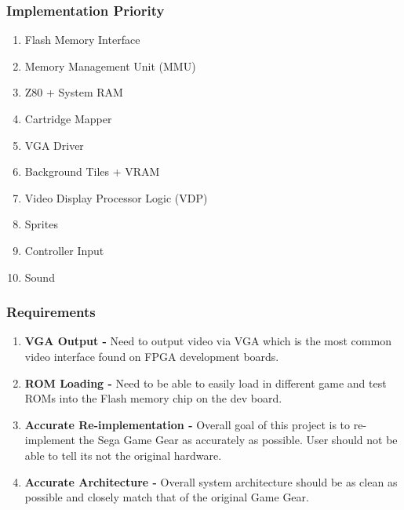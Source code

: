 \documentclass[xcolor=table]{beamer}
\newlength{\wideitemsep}
\let\olditem\item
\renewcommand{\item}{\setlength{\itemsep}{\wideitemsep}\olditem}
\begin{document}
\begin{frame}
    \frametitle{Implementation Priority}
    \begin{enumerate}
        \olditem Flash Memory Interface
        \olditem Memory Management Unit (MMU)
        \olditem Z80 + System RAM
        \olditem Cartridge Mapper
        \olditem VGA Driver
        \olditem Background Tiles + VRAM
        \olditem Video Display Processor Logic (VDP)
        \olditem Sprites
        \olditem Controller Input
        \olditem Sound
    \end{enumerate}
\end{frame}

\begin{frame}
    \frametitle{Requirements}
    \begin{enumerate}
        \item<1-> \textbf{VGA Output -} Need to output video via VGA which is
            the most common video interface found on FPGA development boards.
        \item<2-> \textbf{ROM Loading -} Need to be able to easily load in
            different game and test ROMs into the Flash memory chip on the dev
            board.
        \item<3-> \textbf{Accurate Re-implementation -} Overall goal of this
            project is to re-implement the Sega Game Gear as accurately as
            possible. User should not be able to tell its not the original
            hardware.
        \item<4-> \textbf{Accurate Architecture -} Overall system architecture
            should be as clean as possible and closely match that of the
            original Game Gear.
    \end{enumerate}
\end{frame}
\end{document}
